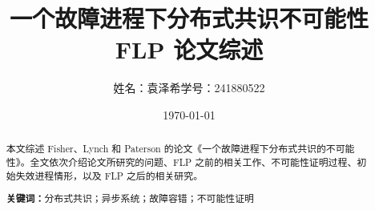 \documentclass[UTF8,zihao=-4,a4paper]{ctexart}
\title{\heiti\mdseries\zihao{2} 一个故障进程下分布式共识不可能性\\[0.8em]
  \zihao{4}\songti FLP 论文综述}
\author{姓名：袁泽希\qquad 学号：241880522}
\date{\today}
\begin{document}
\maketitle
\thispagestyle{plain}

\begin{abstract}
本文综述 Fisher、Lynch 和 Paterson 的论文《一个故障进程下分布式共识的不可能性》。全文依次介绍论文所研究的问题、FLP 之前的相关工作、不可能性证明过程、初始失效进程情形，以及 FLP 之后的相关研究。

\noindent\textbf{关键词：}分布式共识；异步系统；故障容错；不可能性证明
\end{abstract}

\clearpage
\tableofcontents
\clearpage









\begingroup
{}


\endgroup
\end{document}
